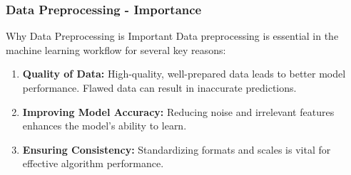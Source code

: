 \documentclass[aspectratio=169]{beamer}
\begin{document}
\begin{frame}[fragile]
    \frametitle{Data Preprocessing - Importance}
    \begin{block}{Why Data Preprocessing is Important}
        Data preprocessing is essential in the machine learning workflow for several key reasons:
        \begin{enumerate}
            \item \textbf{Quality of Data:} High-quality, well-prepared data leads to better model performance. Flawed data can result in inaccurate predictions.
            \item \textbf{Improving Model Accuracy:} Reducing noise and irrelevant features enhances the model's ability to learn.
            \item \textbf{Ensuring Consistency:} Standardizing formats and scales is vital for effective algorithm performance.
        \end{enumerate}
    \end{block}
\end{frame}
\end{document}
